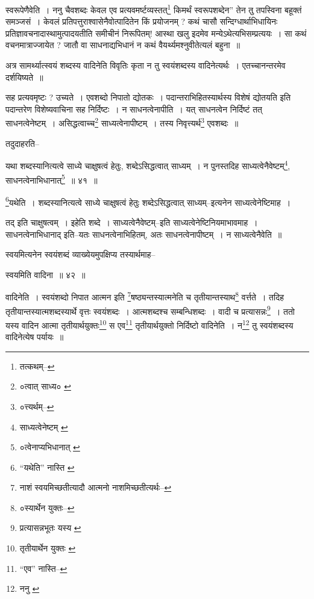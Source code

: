 \documentclass[article,12pt,a4paper]{memoir}
\begin{document}
	स्वरूपेणैवेति । ननु चैवशब्दः केवल एव प्रत्यवमर्ष्टव्यस्तत्\footnote{तत्कथम्--\cite{dp-msB}} किमर्थं स्वरूपशब्देन” तेन तु तपस्विना बहूक्तं समञ्जसं । केवलं प्रतिपत्तुराश्वासेनैवोत्पादितेन किं प्रयोजनम् ? कथं चासौ सन्दिग्धार्थाभिधायिनः प्रतिज्ञावचनादास्थामुत्पादयतीति समीचीनं निरूपितम्! आस्था खलु इदमेव मन्येऽथेत्यभिसम्प्रत्ययः । सा कथं वचनमात्राज्जायेत ? जातौ वा साधनाद्यभिधानं न कथं वैयर्थ्यमश्नुवीतेत्यलं बहुना ॥
	\pend
      

	  \pstart अत्र सामर्थ्यात्स्वयं शब्दस्य वादिनेति विवृतिः कृता न तु स्वयंशब्दस्य वादिनेत्यर्थः । एतच्चानन्तरमेव दर्शयिष्यते ॥
	\pend
	  \bigskip
	  \begingroup
	

	  \pstart सह प्रत्यवमृष्टः ? उच्यते । एवशब्दो निपातो द्योतकः । पदान्तराभिहितस्यार्थस्य विशेषं द्योतयति इति पदान्तरेण विशेष्यवाचिना सह निर्दिष्टः । न साधनत्वेनापीति । यत् साधनत्वेन निर्दिष्टं तत् साधनत्वेनेष्टम् । असिद्धत्वाच्च\footnote{०त्वात् साध्य० \cite{dp-msB}} साध्यत्वेनापीष्टम् । तस्य निवृत्त्यर्थ\footnote{०त्त्यर्थम्--\cite{dp-msD}} एवशब्दः ॥
	\pend
       

	  \pstart तदुदाहरति--
	\pend
       
	  \bigskip
	  \begingroup
	

	  \pstart यथा शब्दस्यानित्यत्वे साध्ये चाक्षुषत्वं हेतुः, शब्देऽसिद्धत्वात् साध्यम् । न पुनस्तदिह साध्यत्वेनैवेष्टम्\footnote{साध्यत्वेनेष्टम् \cite{dp-msC} \cite{dp-msD} \cite{dp-edE}}\-, साधनत्वेनाभिधानात्\footnote{०त्वेनाप्यभिधानात् \cite{dp-msB} \cite{dp-edP} \cite{dp-edH} \cite{dp-edE} \cite{dp-edN}} ॥ ४१ ॥
	\pend
      
	  \endgroup
	 

	  \pstart \footnote{“यथेति” नास्ति \cite{dp-msA}}\-यथेति । शब्दस्यानित्यत्वे साध्ये चाक्षुषत्वं हेतुः शब्देऽसिद्धत्वात् साध्यम्--इत्यनेन साध्यत्वेनेष्टिमाह ।
	\pend
       

	  \pstart तद् इति चाक्षुषत्वम् । इहेति शब्दे । साध्यत्वेनैवेष्टम्--इति साध्यत्वेनेष्टिनियमाभावमाह । साधनत्वेनाभिधानाद् इति--यतः साधनत्वेनाभिहितम्, अतः साधनत्वेनापीष्टम् । न साध्यत्वेनैवेति ॥
	\pend
       

	  \pstart स्वयमित्यनेन स्वयंशब्दं व्याख्येयमुपक्षिप्य तस्यार्थमाह--
	\pend
       
	  \bigskip
	  \begingroup
	

	  \pstart स्वयमिति वादिना ॥ ४२ ॥
	\pend
      
	  \endgroup
	 

	  \pstart वादिनेति । स्वयंशब्दो निपात आत्मन इति \footnote{नाशं स्वयमिच्छतीत्यादौ आत्मनो नाशमिच्छतीत्यर्थः--\cite{dp-msD-n}}\-षष्ठ्यन्तस्यात्मनेति च तृतीयान्तस्याथ\footnote{०स्यार्थेन युक्तः--\cite{dp-msB}} वर्त्तते । तदिह तृतीयान्तस्यात्मशब्दस्यार्थे वृत्तः स्वयंशब्दः । आत्मशब्दश्च सम्बन्धिशब्दः । वादी च प्रत्यासन्नः\footnote{प्रत्यासन्नभूतः यस्य \cite{dp-msA} \cite{dp-msB} \cite{dp-edP} \cite{dp-edH}} । ततो यस्य वादिन आत्मा तृतीयार्थयुक्तः\footnote{तृतीयार्थेन युक्तः \cite{dp-msC} \cite{dp-msD}} स एव\footnote{“एव” नास्ति--\cite{dp-msB}} तृतीयार्थयुक्तो निर्दिष्टो वादिनेति । न\footnote{ननु \cite{dp-msA} \cite{dp-msB} \cite{dp-edP} \cite{dp-edH}} तु स्वयंशब्दस्य वादिनेत्येष पर्यायः ॥
	\pend
      
\end{document}
